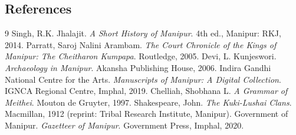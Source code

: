 \documentclass{article}
\begin{document}
\subsection*{References}
\begin{thebibliography}{9}
     Singh, R.K. Jhalajit. \textit{A Short History of Manipur}. 4th ed., Manipur: RKJ, 2014.
     Parratt, Saroj Nalini Arambam. \textit{The Court Chronicle of the Kings of Manipur: The Cheitharon Kumpapa}. Routledge, 2005.
     Devi, L. Kunjeswori. \textit{Archaeology in Manipur}. Akansha Publishing House, 2006.
     Indira Gandhi National Centre for the Arts. \textit{Manuscripts of Manipur: A Digital Collection}. IGNCA Regional Centre, Imphal, 2019.
     Chelliah, Shobhana L. \textit{A Grammar of Meithei}. Mouton de Gruyter, 1997.
     Shakespeare, John. \textit{The Kuki-Lushai Clans}. Macmillan, 1912 (reprint: Tribal Research Institute, Manipur).
     Government of Manipur. \textit{Gazetteer of Manipur}. Government Press, Imphal, 2020.
\end{thebibliography}
\end{document}

